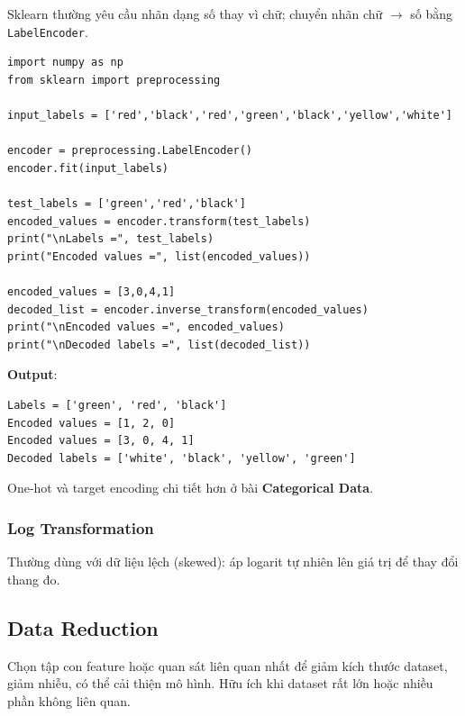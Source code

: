 \begin{ynghia}[title={Label encoding}]
Sklearn thường yêu cầu nhãn dạng số thay vì chữ; chuyển nhãn chữ $\rightarrow$ số bằng \texttt{LabelEncoder}.
\end{ynghia}

\begin{vidu}[title={LabelEncoder}]
\begin{lstlisting}
import numpy as np
from sklearn import preprocessing

input_labels = ['red','black','red','green','black','yellow','white']

encoder = preprocessing.LabelEncoder()
encoder.fit(input_labels)

test_labels = ['green','red','black']
encoded_values = encoder.transform(test_labels)
print("\nLabels =", test_labels)
print("Encoded values =", list(encoded_values))

encoded_values = [3,0,4,1]
decoded_list = encoder.inverse_transform(encoded_values)
print("\nEncoded values =", encoded_values)
print("\nDecoded labels =", list(decoded_list))
\end{lstlisting}
\textbf{Output}:
\begin{lstlisting}
Labels = ['green', 'red', 'black']
Encoded values = [1, 2, 0]
Encoded values = [3, 0, 4, 1]
Decoded labels = ['white', 'black', 'yellow', 'green']
\end{lstlisting}
One-hot và target encoding chi tiết hơn ở bài \textbf{Categorical Data}.
\end{vidu}

\subsubsection{Log Transformation}

\begin{ynghia}[title={Log transform}]
Thường dùng với dữ liệu lệch (skewed): áp logarit tự nhiên lên giá trị để thay đổi thang đo.
\end{ynghia}

\subsection{Data Reduction}

\begin{dinhnghia}[title={Giảm dữ liệu}]
Chọn tập con feature hoặc quan sát liên quan nhất để giảm kích thước dataset, giảm nhiễu, có thể cải thiện mô hình.
Hữu ích khi dataset rất lớn hoặc nhiều phần không liên quan.
\end{dinhnghia}

